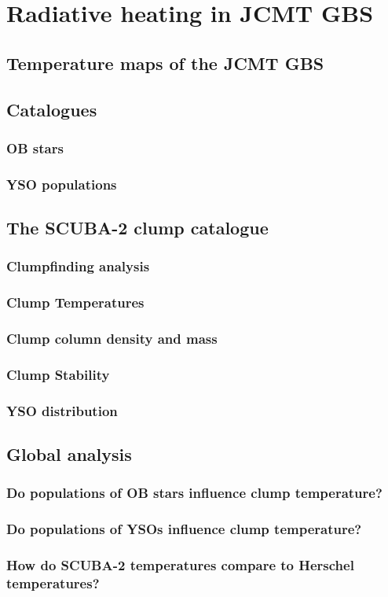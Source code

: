 \chapter{Radiative heating in JCMT GBS}
\label{ch:chapter8}

\section{Temperature maps of the JCMT GBS}
\section{Catalogues}
\subsection{OB stars}
\subsection{YSO populations}
\section{The SCUBA-2 clump catalogue}
\subsection{Clumpfinding analysis}
\subsection{Clump Temperatures}
\subsection{Clump column density and mass}
\subsection{Clump Stability}
\subsection{YSO distribution}
\section{Global analysis}
\subsection{Do populations of OB stars influence clump temperature?}
\subsection{Do populations of YSOs influence clump temperature?}
\subsection{How do SCUBA-2 temperatures compare to Herschel temperatures?}